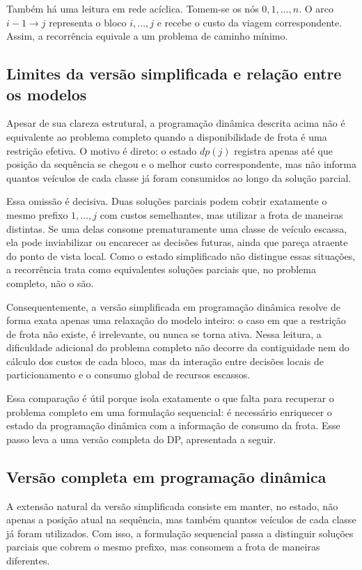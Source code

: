 Também há uma leitura em rede acíclica. Tomem-se os nós \(0,1,\dots,n\). O arco
\(i-1 \to j\) representa o bloco \(i,\dots,j\) e recebe o custo da viagem
correspondente. Assim, a recorrência equivale a um problema de caminho mínimo.

\subsection{Limites da versão simplificada e relação entre os modelos}

Apesar de sua clareza estrutural, a programação dinâmica descrita acima não é
equivalente ao problema completo quando a disponibilidade de frota é uma
restrição efetiva. O motivo é direto: o estado \(dp(j)\) registra apenas até que
posição da sequência se chegou e o melhor custo correspondente, mas não informa
quantos veículos de cada classe já foram consumidos ao longo da solução parcial.

Essa omissão é decisiva. Duas soluções parciais podem cobrir exatamente o mesmo
prefixo \(1,\dots,j\) com custos semelhantes, mas utilizar a frota de maneiras
distintas. Se uma delas consome prematuramente uma classe de veículo escassa,
ela pode inviabilizar ou encarecer as decisões futuras, ainda que pareça
atraente do ponto de vista local. Como o estado simplificado não distingue essas
situações, a recorrência trata como equivalentes soluções parciais que, no
problema completo, não o são.

Consequentemente, a versão simplificada em programação dinâmica resolve de forma
exata apenas uma relaxação do modelo inteiro: o caso em que a restrição de frota
não existe, é irrelevante, ou nunca se torna ativa. Nessa leitura, a dificuldade
adicional do problema completo não decorre da contiguidade nem do cálculo dos
custos de cada bloco, mas da interação entre decisões locais de particionamento
e o consumo global de recursos escassos.

Essa comparação é útil porque isola exatamente o que falta para recuperar o
problema completo em uma formulação sequencial: é necessário enriquecer o estado
da programação dinâmica com a informação de consumo da frota. Esse passo leva a
uma versão completa do DP, apresentada a seguir.

\subsection{Versão completa em programação dinâmica}

A extensão natural da versão simplificada consiste em manter, no estado, não
apenas a posição atual na sequência, mas também quantos veículos de cada classe
já foram utilizados. Com isso, a formulação sequencial passa a distinguir
soluções parciais que cobrem o mesmo prefixo, mas consomem a frota de maneiras
diferentes.

